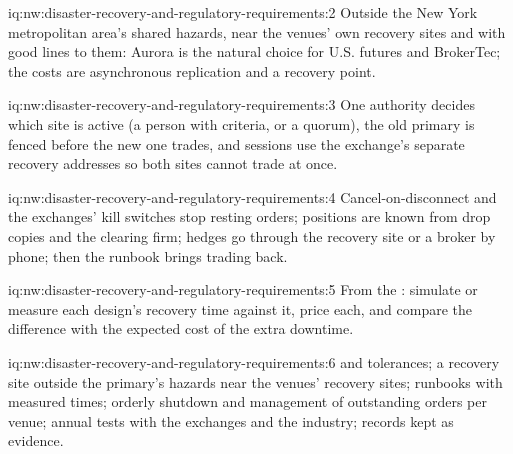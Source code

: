 \begin{solution}{iq:nw:disaster-recovery-and-regulatory-requirements:2}
Outside the New York metropolitan area's shared hazards, near the venues' own recovery sites and with good lines to them: Aurora is the
natural choice for U.S. futures and BrokerTec; the costs are asynchronous replication and a recovery point.
\end{solution}

\begin{solution}{iq:nw:disaster-recovery-and-regulatory-requirements:3}
One authority decides which site is active (a person with criteria, or a quorum), the old primary is fenced before the new one trades, and
sessions use the exchange's separate recovery addresses so both sites cannot trade at once.
\end{solution}

\begin{solution}{iq:nw:disaster-recovery-and-regulatory-requirements:4}
Cancel-on-disconnect and the exchanges' kill switches stop resting orders; positions are known from drop copies and the clearing firm;
hedges go through the recovery site or a broker by phone; then the runbook brings trading back.
\end{solution}

\begin{solution}{iq:nw:disaster-recovery-and-regulatory-requirements:5}
From the : simulate or measure each design's recovery time against it, price each, and compare the difference with the
expected cost of the extra downtime.
\end{solution}

\begin{solution}{iq:nw:disaster-recovery-and-regulatory-requirements:6}
 and tolerances; a recovery site outside the primary's hazards near the venues' recovery sites; runbooks with
measured times; orderly shutdown and management of outstanding orders per venue; annual tests with the exchanges and the industry; records
kept as evidence.
\end{solution}
